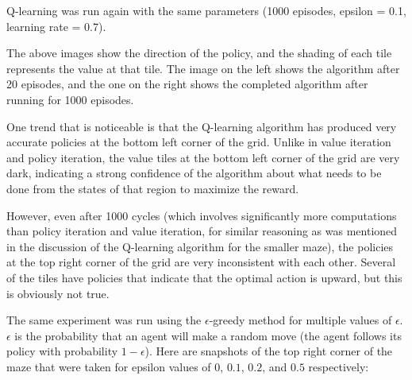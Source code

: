 \documentclass[11pt]{article}
\begin{document}
            Q-learning was run again with the same parameters (1000 episodes,
            epsilon = 0.1, learning rate = 0.7).

            The above images show the direction of the policy, and the shading
            of each tile represents the value at that tile. The image on the left
            shows the algorithm after 20 episodes, and the one on the right shows
            the completed algorithm after running for 1000 episodes.

            One trend that is noticeable is that the Q-learning algorithm has produced
            very accurate policies at the bottom left corner of the grid. Unlike in value
            iteration and policy iteration, the value tiles at the bottom left corner of
            the grid are very dark, indicating a strong confidence of the algorithm about
            what needs to be done from the states of that region to maximize the reward.

            However, even after 1000 cycles (which involves significantly more computations
            than policy iteration and value iteration, for similar reasoning as was
            mentioned in the discussion of the Q-learning algorithm for the smaller maze),
            the policies at the top right corner of the grid are very inconsistent
            with each other. Several
            of the tiles have policies that indicate that the optimal action is upward, but
            this is obviously not true.

            The same experiment was run using the $\epsilon$-greedy method for multiple
            values of $\epsilon$. $\epsilon$ is the probability that an agent will make a random
            move (the agent follows its policy with probability $1 - \epsilon$).
            Here are snapshots of the top right corner of the maze that were taken for epsilon values
            of $0$, $0.1$, $0.2$, and $0.5$ respectively:
\end{document}
